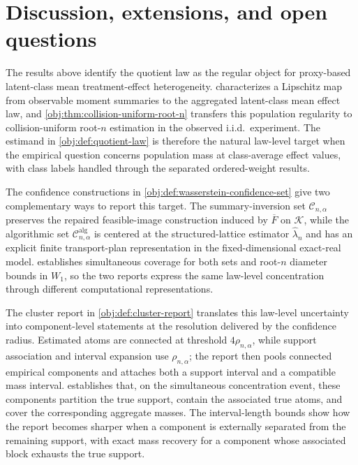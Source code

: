 \section{Discussion, extensions, and open questions}

The results above identify the quotient law as the regular object for proxy-based latent-class mean treatment-effect heterogeneity.  characterizes a Lipschitz map from observable moment summaries to the aggregated latent-class mean effect law, and \cref{obj:thm:collision-uniform-root-n} transfers this population regularity to collision-uniform root-\(n\) estimation in the observed i.i.d.\ experiment. The estimand in \cref{obj:def:quotient-law} is therefore the natural law-level target when the empirical question concerns population mass at class-average effect values, with class labels handled through the separated ordered-weight results.

The confidence constructions in \cref{obj:def:wasserstein-confidence-set} give two complementary ways to report this target. The summary-inversion set \(\mathcal C_{n,\alpha}\) preserves the repaired feasible-image construction induced by \(\overline F\) on \(\mathcal K\), while the algorithmic set \(\mathcal C^{\mathrm{alg}}_{n,\alpha}\) is centered at the structured-lattice estimator \(\widehat\lambda_n\) and has an explicit finite transport-plan representation in the fixed-dimensional exact-real model.  establishes simultaneous coverage for both sets and root-\(n\) diameter bounds in \(W_1\), so the two reports express the same law-level concentration through different computational representations.

The cluster report in \cref{obj:def:cluster-report} translates this law-level uncertainty into component-level statements at the resolution delivered by the confidence radius. Estimated atoms are connected at threshold \(4\rho_{n,\alpha}\), while support association and interval expansion use \(\rho_{n,\alpha}\); the report then pools connected empirical components and attaches both a support interval and a compatible mass interval.  establishes that, on the simultaneous concentration event, these components partition the true support, contain the associated true atoms, and cover the corresponding aggregate masses. The interval-length bounds show how the report becomes sharper when a component is externally separated from the remaining support, with exact mass recovery for a component whose associated block exhausts the true support.


